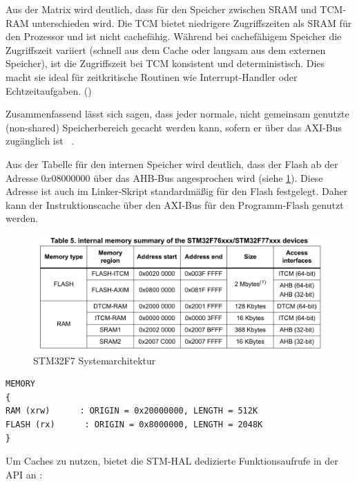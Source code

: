 Aus der Matrix wird deutlich, dass für den Speicher zwischen SRAM und TCM-RAM
unterschieden wird. Die \ac{TCM} bietet niedrigere Zugriffszeiten als SRAM für
den Prozessor und ist nicht cachefähig. Während bei cachefähigem Speicher die
Zugriffszeit variiert (schnell aus dem Cache oder langsam aus dem externen
Speicher), ist die Zugriffszeit bei TCM konsistent und deterministisch. Dies
macht sie ideal für zeitkritische Routinen wie Interrupt-Handler oder
Echtzeitaufgaben. (\cite{arm_den0042})

Zusammenfassend lässt sich sagen, dass jeder normale, nicht gemeinsam genutzte
(non-shared) Speicherbereich gecacht werden kann, sofern er über das AXI-Bus
zugänglich ist \cite[S. 4]{an4839}~\cite[S. 7]{an4667}.

Aus der Tabelle für den internen Speicher wird deutlich, dass der Flash ab der
Adresse $0x0800 0000$ über das AHB-Bus angesprochen wird (siehe
\ref{fig:internal_mem_table}). Diese Adresse ist auch im Linker-Skript
standardmäßig für den Flash festgelegt. Daher kann der Instruktionscache über
den AXI-Bus für den Programm-Flash genutzt werden.

\begin{figure}[htb]
    \centering
    \includegraphics[width=1\textwidth]{assets/internal_mem_table}
    \caption{STM32F7 Systemarchitektur \cite[S. 14]{an4667}}
    \label{fig:internal_mem_table}
\end{figure}

\begin{code}
\begin{verbatim}
MEMORY
{
RAM (xrw)      : ORIGIN = 0x20000000, LENGTH = 512K
FLASH (rx)      : ORIGIN = 0x8000000, LENGTH = 2048K
}
\end{verbatim}
\end{code}

Um Caches zu nutzen, bietet die STM-\ac{HAL} dedizierte Funktionsaufrufe in der
API an \cite[S. 4]{an4839}:

